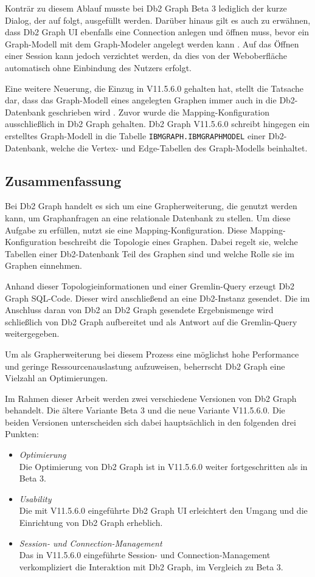 Konträr zu diesem Ablauf musste bei Db2 Graph Beta 3 lediglich der kurze Dialog, der auf  folgt, ausgefüllt werden. Darüber hinaus gilt es auch zu erwähnen, dass Db2 Graph UI ebenfalls eine Connection anlegen und öffnen muss, bevor ein Graph-Modell mit dem Graph-Modeler angelegt werden kann \cite{ibm_docs_db2_graph_ui}. Auf das Öffnen einer Session kann jedoch verzichtet werden, da dies von der Weboberfläche automatisch ohne Einbindung des Nutzers erfolgt.

Eine weitere Neuerung, die Einzug in V11.5.6.0 gehalten hat, stellt die Tatsache dar, dass das Graph-Modell eines angelegten Graphen immer auch in die Db2-Datenbank geschrieben wird \cite{ibm_docs_privileges}. Zuvor wurde die Mapping-Konfiguration ausschließlich in Db2 Graph gehalten. Db2 Graph V11.5.6.0 schreibt hingegen ein erstelltes Graph-Modell in die Tabelle \texttt{IBMGRAPH.IBMGRAPHMODEL} einer Db2-Datenbank, welche die Vertex- und Edge-Tabellen des Graph-Modells beinhaltet. 

\subsection{Zusammenfassung}

Bei Db2 Graph handelt es sich um eine Grapherweiterung, die genutzt werden kann, um Graphanfragen an eine relationale Datenbank zu stellen. Um diese Aufgabe zu erfüllen, nutzt sie eine Mapping-Konfiguration. Diese Mapping-Konfiguration beschreibt die Topologie eines Graphen. Dabei regelt sie, welche Tabellen einer Db2-Datenbank Teil des Graphen sind und welche Rolle sie im Graphen einnehmen.

Anhand dieser Topologieinformationen und einer Gremlin-Query erzeugt Db2 Graph SQL-Code. Dieser wird anschließend an eine Db2-Instanz gesendet. Die im Anschluss daran von Db2 an Db2 Graph gesendete Ergebnismenge wird schließlich von Db2 Graph aufbereitet und als Antwort auf die Gremlin-Query weitergegeben. 

Um als Grapherweiterung bei diesem Prozess eine möglichst hohe Performance und geringe Ressourcenauslastung aufzuweisen, beherrscht Db2 Graph eine Vielzahl an Optimierungen. 

Im Rahmen dieser Arbeit werden zwei verschiedene Versionen von Db2 Graph behandelt. Die ältere Variante Beta 3 und die neue Variante V11.5.6.0. Die beiden Versionen unterscheiden sich dabei hauptsächlich in den folgenden drei Punkten:

\begin{itemize}
    \item \textit{Optimierung}\\
    Die Optimierung von Db2 Graph ist in V11.5.6.0 weiter fortgeschritten als in Beta 3. 
    \item \textit{Usability}\\
    Die mit V11.5.6.0 eingeführte Db2 Graph UI erleichtert den Umgang und die Einrichtung von Db2 Graph erheblich. 
    \item \textit{Session- und Connection-Management}\\
    Das in V11.5.6.0 eingeführte Session- und Connection-Management verkompliziert die Interaktion mit Db2 Graph, im Vergleich zu Beta 3.
\end{itemize}